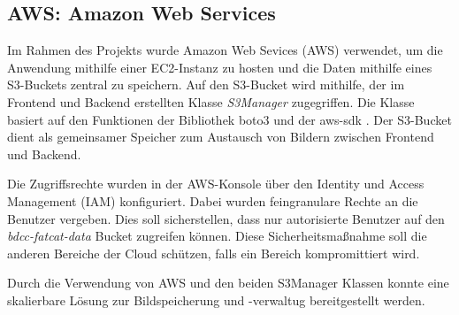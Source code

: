 \subsection{AWS: Amazon Web Services}
Im Rahmen des Projekts wurde Amazon Web Sevices (AWS) verwendet, um die Anwendung mithilfe einer EC2-Instanz zu hosten und die Daten mithilfe eines S3-Buckets zentral zu speichern. Auf den
S3-Bucket wird mithilfe, der im Frontend und Backend erstellten Klasse \textit{S3Manager} zugegriffen. Die Klasse basiert auf den Funktionen der Bibliothek boto3 \cite{boto3} und der aws-sdk \cite{awsSdk}. Der S3-Bucket dient als gemeinsamer Speicher zum Austausch von Bildern zwischen Frontend und Backend. 

Die Zugriffsrechte wurden in der AWS-Konsole über den Identity und Access Management (IAM) konfiguriert. Dabei wurden feingranulare Rechte an die Benutzer 
vergeben. Dies soll sicherstellen, dass nur autorisierte Benutzer auf den \textit{bdcc-fatcat-data} Bucket zugreifen können. Diese Sicherheitsmaßnahme soll die anderen Bereiche der Cloud schützen, falls ein Bereich kompromittiert wird.

Durch die Verwendung von AWS und den beiden S3Manager Klassen konnte eine skalierbare Lösung zur Bildspeicherung und -verwaltug bereitgestellt werden.